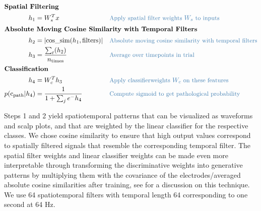\begin{align*}
    \intertext{\textbf{Spatial Filtering}}
    h_1 &= W_s^Tx && \codecomment{\text{Apply spatial filter weights } W_s \text{ to  inputs }} \\
    \intertext{\textbf{Absolute Moving Cosine Similarity with Temporal Filters}}
    h_2 &= |\mathrm{cos\_sim}(h_1, \mathrm{filters})| && \codecomment{\text{Absolute moving cosine similarity with temporal filters}} \\
    h_3 &=\frac{\sum_t (h_2)}{n_\mathrm{times}} && \codecomment{\text{Average over timepoints in trial}} \\
    \intertext{\textbf{Classification}}
    h_4 &= W_c^Th_3 && \codecomment{\text{Apply classifierweights } W_c \text{ on these features }} \\
p(\mathrm{c_\mathrm{path}}|h_4) &= \frac{1}{1 + \sum_j e^-h_{4}} && \codecomment{\text{Compute sigmoid to get pathological probability}} \\
\end{align*}

Steps 1 and 2 yield spatiotemporal patterns that can be visualized as
waveforms and scalp plots, and that are weighted by the linear
classifier for the respective classes. We chose cosine similarity to
ensure that high output values correspond to spatially filtered signals
that resemble the corresponding temporal filter. The spatial filter
weights and linear classifier weights can be made even more
interpretable through transforming the discriminative weights into
generative patterns by multiplying them with the covariance of the
electrodes/averaged absolute cosine similarities after training, see
\citet{haufe_interpretation_2014} for a discussion on this
technique. We use 64 spatiotemporal filters with temporal length 64
corresponding to one second at 64 Hz.


